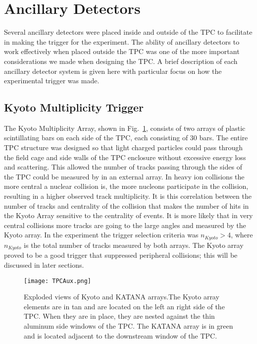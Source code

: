 \section{Ancillary Detectors }
Several ancillary detectors were placed inside and outside of the \spirit TPC to facilitate in making the trigger for the experiment. The ability of ancillary detectors to work effectively when placed outside the TPC  was one of the more important considerations we made when designing the TPC. A brief description of each ancillary detector system is given here with particular focus on how the experimental trigger was made. 


\subsection{Kyoto Multiplicity Trigger}
\label{sec:kyoto}
 The Kyoto Multiplicity Array, shown in Fig.~\ref{fig:aux}, consists of two arrays of plastic scintillating bars on each side of the TPC, each consisting of 30 bars. The entire TPC structure was designed so that light charged particles could pass through the field cage and side walls of the TPC enclosure without excessive energy loss and scattering. This allowed the number of tracks passing through the sides of the TPC could be measured by in an external array. In heavy ion collisions the more central a nuclear collision is, the more nucleons participate in the collision, resulting in a higher observed track multiplicity. It is this correlation between the number of tracks and centrality of the collision that makes the number of hits in the Kyoto Array sensitive to the centrality of events. It is more likely that in very central collisions more tracks are going to the large angles and measured by the Kyoto array. In the experiment the trigger selection criteria was $n_{Kyoto} > 4$, where $n_{Kyoto}$ is the total number of tracks measured by both arrays. The Kyoto array proved to be a good trigger that suppressed peripheral collisions; this will be discussed in later sections. 

\begin{figure}[!htb]
\texttt{[image: TPCAux.png]}
\caption{Exploded views of Kyoto and KATANA arrays.The Kyoto array elements are in tan and are located on the left an right side of the TPC. When they are in place, they are nested against the thin aluminum side windows of the TPC. The KATANA array is in green and is located adjacent to the downstream window of the TPC.}
\label{fig:aux}
\end{figure}


